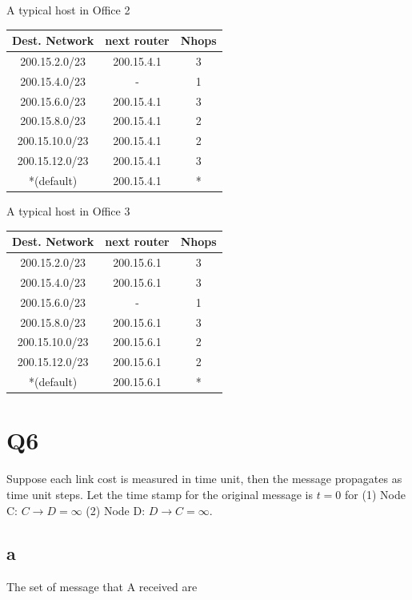 \documentclass[a4paper, 11pt]{article}
\begin{document}
\begin{center}
	A typical host in Office 2
	\vspace{4mm}
	
	\begin{tabular}{|c|c|c|}
		\hline
		Dest. Network	&	next router		&	Nhops	\\ \hline
		200.15.2.0/23	&	200.15.4.1	&	3	\\ \hline
		200.15.4.0/23	&	-			&	1	\\ \hline
		200.15.6.0/23	&	200.15.4.1	&	3	\\ \hline
		200.15.8.0/23	&	200.15.4.1	&	2	\\ \hline
		200.15.10.0/23	&	200.15.4.1	&	2	\\ \hline
		200.15.12.0/23	&	200.15.4.1	&	3	\\ \hline
		*(default)	&	200.15.4.1	&	*	\\ \hline
	\end{tabular}
\end{center}

\begin{center}
	A typical host in Office 3
	\vspace{4mm}
	
	\begin{tabular}{|c|c|c|}
		\hline
		Dest. Network	&	next router		&	Nhops	\\ \hline
		200.15.2.0/23	&	200.15.6.1	&	3	\\ \hline
		200.15.4.0/23	&	200.15.6.1	&	3	\\ \hline
		200.15.6.0/23	&	-			&	1	\\ \hline
		200.15.8.0/23	&	200.15.6.1	&	3	\\ \hline
		200.15.10.0/23	&	200.15.6.1	&	2	\\ \hline
		200.15.12.0/23	&	200.15.6.1	&	2	\\ \hline
		*(default)	&	200.15.6.1	&	*	\\ \hline
	\end{tabular}
\end{center}

\section{Q6}
	Suppose each link cost is measured in time unit, then the message propagates
	as time unit steps. Let the time stamp for the original message is $t=0$ for
	(1) Node C: $C \to D = \infty $ (2) Node D: $D \to C = \infty$.
	\subsection{a}
	The set of message that A received are
	\vspace{4mm}
	
\end{document}
